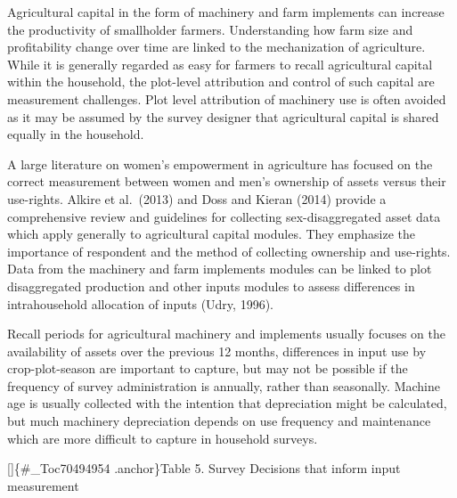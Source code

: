 \documentclass[
]{book}
\begin{document}
Agricultural capital in the form of machinery and farm implements can increase the productivity of smallholder farmers. Understanding how farm size and profitability change over time are linked to the mechanization of agriculture. While it is generally regarded as easy for farmers to recall agricultural capital within the household, the plot-level attribution and control of such capital are measurement challenges. Plot level attribution of machinery use is often avoided as it may be assumed by the survey designer that agricultural capital is shared equally in the household.

A large literature on women's empowerment in agriculture has focused on the correct measurement between women and men's ownership of assets versus their use-rights. Alkire et al.~(2013) and Doss and Kieran (2014) provide a comprehensive review and guidelines for collecting sex-disaggregated asset data which apply generally to agricultural capital modules. They emphasize the importance of respondent and the method of collecting ownership and use-rights. Data from the machinery and farm implements modules can be linked to plot disaggregated production and other inputs modules to assess differences in intrahousehold allocation of inputs (Udry, 1996).

Recall periods for agricultural machinery and implements usually focuses on the availability of assets over the previous 12 months, differences in input use by crop-plot-season are important to capture, but may not be possible if the frequency of survey administration is annually, rather than seasonally. Machine age is usually collected with the intention that depreciation might be calculated, but much machinery depreciation depends on use frequency and maintenance which are more difficult to capture in household surveys.

{[}{]}\{\#\_Toc70494954 .anchor\}Table 5. Survey Decisions that inform input measurement
\end{document}
